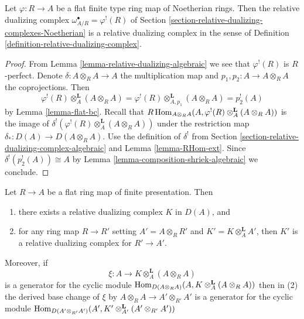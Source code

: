\begin{lemma}
\label{lemma-relative-dualizing-noetherian}
Let $\varphi : R \to A$ be a flat finite type ring map of Noetherian rings.
Then the relative dualizing complex $\omega_{A/R}^\bullet = \varphi^!(R)$
of Section \ref{section-relative-dualizing-complexes-Noetherian}
is a relative dualizing complex in the sense of
Definition \ref{definition-relative-dualizing-complex}.
\end{lemma}

\begin{proof}
From Lemma \ref{lemma-relative-dualizing-algebraic} we see that
$\varphi^!(R)$ is $R$-perfect.
Denote $\delta : A \otimes_R A \to A$ the multiplication map
and $p_1, p_2 : A \to A \otimes_R A$ the coprojections.
Then
$$
\varphi^!(R) \otimes_A^\mathbf{L} (A \otimes_R A) =
\varphi^!(R) \otimes_{A, p_1}^\mathbf{L} (A \otimes_R A) =
p_2^!(A)
$$
by Lemma \ref{lemma-flat-bc}. Recall that
$
R\mathop{\mathrm{Hom}}\nolimits_{A \otimes_R A}(A, \varphi^!(R) \otimes_A^\mathbf{L} (A \otimes_R A))
$
is the image of $\delta^!(\varphi^!(R) \otimes_A^\mathbf{L} (A \otimes_R A))$
under the restriction map $\delta_* : D(A) \to D(A \otimes_R A)$.
Use the definition of $\delta^!$ from
Section \ref{section-relative-dualizing-complex-algebraic}
and Lemma \ref{lemma-RHom-ext}.
Since $\delta^!(p_2^!(A)) \cong A$ by
Lemma \ref{lemma-composition-shriek-algebraic}
we conclude.
\end{proof}

\begin{lemma}
\label{lemma-base-change-relative-dualizing}
Let $R \to A$ be a flat ring map of finite presentation. Then
\begin{enumerate}
\item there exists a relative dualizing complex $K$ in $D(A)$, and
\item for any ring map $R \to R'$ setting $A' = A \otimes_R R'$
and $K' = K \otimes_A^\mathbf{L} A'$, then $K'$ is a
relative dualizing complex for $R' \to A'$.
\end{enumerate}
Moreover, if
$$
\xi : A \longrightarrow K \otimes_A^\mathbf{L} (A \otimes_R A)
$$
is a generator for the cyclic module
$\mathop{\mathrm{Hom}}\nolimits_{D(A \otimes_R A)}(A, K \otimes_A^\mathbf{L} (A \otimes_R A))$
then in (2) the derived base change of $\xi$ by
$A \otimes_R A \to A' \otimes_{R'} A'$ is a generator for
the cyclic module
$\mathop{\mathrm{Hom}}\nolimits_{D(A' \otimes_{R'} A')}(A',
K' \otimes_{A'}^\mathbf{L} (A' \otimes_{R'} A'))$
\end{lemma}

